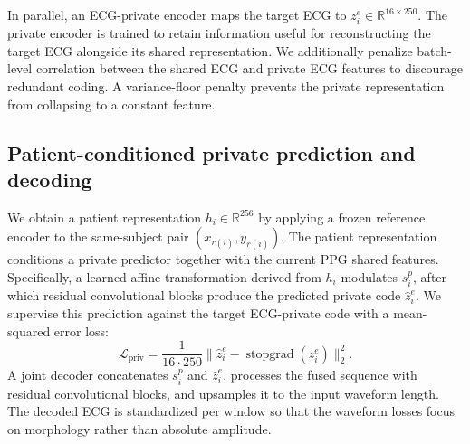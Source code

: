 In parallel, an ECG-private encoder maps the target ECG to $z_i^{e}\in\mathbb{R}^{16\times250}$. The private encoder is trained to retain information useful for reconstructing the target ECG alongside its shared representation. We additionally penalize batch-level correlation between the shared ECG and private ECG features to discourage redundant coding. A variance-floor penalty prevents the private representation from collapsing to a constant feature.

\subsection{Patient-conditioned private prediction and decoding}
\label{sec:private-prediction}
We obtain a patient representation $h_i\in\mathbb{R}^{256}$ by applying a frozen reference encoder to the same-subject pair $(x_{r(i)},y_{r(i)})$. The patient representation conditions a private predictor together with the current PPG shared features. Specifically, a learned affine transformation derived from $h_i$ modulates $s_i^{p}$, after which residual convolutional blocks produce the predicted private code $\hat z_i^{e}$. We supervise this prediction against the target ECG-private code with a mean-squared error loss:
\begin{equation}
\mathcal{L}_{\mathrm{priv}}
=\frac{1}{16\cdot250}
\|\hat z_i^{e}-\operatorname{stopgrad}(z_i^{e})\|_2^2.
\label{eq:private-supervision}
\end{equation}
A joint decoder concatenates $s_i^{p}$ and $\hat z_i^{e}$, processes the fused sequence with residual convolutional blocks, and upsamples it to the input waveform length. The decoded ECG is standardized per window so that the waveform losses focus on morphology rather than absolute amplitude.

